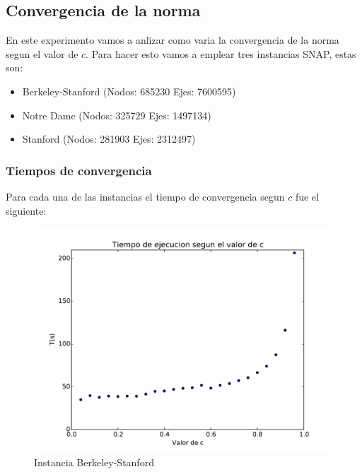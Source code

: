 \pagebreak
\subsection{Convergencia de la norma}

En este experimento vamos a anlizar como varia la convergencia de la norma segun el valor de $c$. Para hacer esto vamos a emplear tres instancias SNAP, estas son:

\begin{itemize}
	\item Berkeley-Stanford (Nodos: 685230 Ejes: 7600595)
	\item Notre Dame (Nodos: 325729 Ejes: 1497134)
	\item Stanford (Nodos: 281903 Ejes: 2312497)
\end{itemize}
	
\subsubsection{Tiempos de convergencia}

Para cada una de las instancias el tiempo de convergencia segun $c$ fue el siguiente:

\begin{figure}[h]
\centering
\includegraphics[scale=0.5]{images/web-BerkStan.pdf}
\caption{Instancia Berkeley-Stanford}
\label{timePageRank}
\end{figure}

